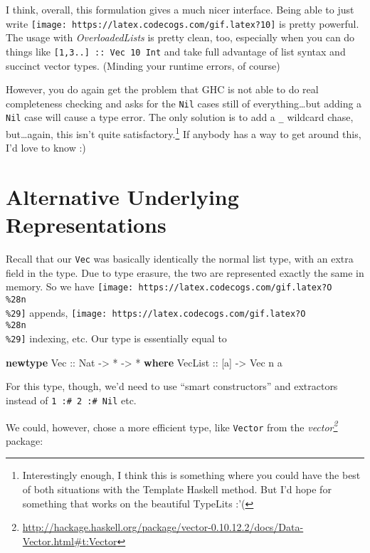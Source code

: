 \documentclass[]{article}
\newenvironment{Shaded}{}{}
\newcommand{\KeywordTok}[1]{\textcolor[rgb]{0.00,0.44,0.13}{\textbf{#1}}}
\newcommand{\DataTypeTok}[1]{\textcolor[rgb]{0.56,0.13,0.00}{#1}}
\newcommand{\OtherTok}[1]{\textcolor[rgb]{0.00,0.44,0.13}{#1}}
\newcommand{\FunctionTok}[1]{\textcolor[rgb]{0.02,0.16,0.49}{#1}}
\newcommand{\NormalTok}[1]{#1}
\renewcommand{\href}[2]{#2\footnote{\url{#1}}}
\begin{document}
I think, overall, this formulation gives a much nicer interface. Being able to
just write \texttt{[image: https://latex.codecogs.com/gif.latex?10]} is pretty
powerful. The usage with \emph{OverloadedLists} is pretty clean, too, especially
when you can do things like \texttt{{[}1,3..{]}\ ::\ Vec\ 10\ Int} and take full
advantage of list syntax and succinct vector types. (Minding your runtime
errors, of course)

However, you do again get the problem that GHC is not able to do real
completeness checking and asks for the \texttt{Nil} cases still of
everything\ldots{}but adding a \texttt{Nil} case will cause a type error. The
only solution is to add a \texttt{\_} wildcard chase, but\ldots{}again, this
isn't quite satisfactory.\footnote{Interestingly enough, I think this is
  something where you could have the best of both situations with the Template
  Haskell method. But I'd hope for something that works on the beautiful
  TypeLits :'(} If anybody has a way to get around this, I'd love to know :)

\section{Alternative Underlying
Representations}\label{alternative-underlying-representations}

Recall that our \texttt{Vec} was basically identically the normal list type,
with an extra field in the type. Due to type erasure, the two are represented
exactly the same in memory. So we have
\texttt{[image: https://latex.codecogs.com/gif.latex?O\\\%28n\\\%29]} appends,
\texttt{[image: https://latex.codecogs.com/gif.latex?O\\\%28n\\\%29]} indexing, etc.
Our type is essentially equal to

\begin{Shaded}
\begin{Highlighting}[]
\KeywordTok{newtype} \DataTypeTok{Vec}\OtherTok{ ::} \DataTypeTok{Nat} \OtherTok{->} \FunctionTok{*} \OtherTok{->} \FunctionTok{*} \KeywordTok{where}
    \DataTypeTok{VecList}\OtherTok{ ::}\NormalTok{ [a] }\OtherTok{->} \DataTypeTok{Vec}\NormalTok{ n a}
\end{Highlighting}
\end{Shaded}

For this type, though, we'd need to use ``smart constructors'' and extractors
instead of \texttt{1\ :\#\ 2\ :\#\ Nil} etc.

We could, however, chose a more efficient type, like \texttt{Vector} from the
\emph{\href{http://hackage.haskell.org/package/vector-0.10.12.2/docs/Data-Vector.html\#t:Vector}{vector}}
package:
\end{document}
